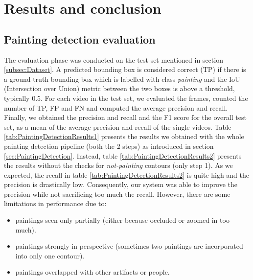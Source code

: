 \documentclass[10pt,twocolumn,letterpaper]{article}
\begin{document}
\section{Results and conclusion}
\label{sec:ResultsAndConclusion}
\subsection{Painting detection evaluation}
\label{subsec:PaintingDetectionEvaluation}

The evaluation phase was conducted on the test set mentioned in section \ref{subsec:Dataset}.
A predicted bounding box is considered correct (TP) if there is a ground-truth bounding box which is labelled with class \textit{painting} and the IoU (Intersection over Union) metric between the two boxes is above a threshold, typically 0.5.
For each video in the test set, we evaluated the frames, counted the number of TP, FP and FN and computed the average precision and recall. Finally, we obtained the precision and recall and the F1 score for the overall test set, as a mean of the average precision and recall of the single videos.
Table \ref{tab:PaintingDetectionResults1} presents the results we obtained with the whole painting detection pipeline (both the 2 steps) as introduced in section \ref{sec:PaintingDetection}. Instead, table \ref{tab:PaintingDetectionResults2} presents the results without the checks for \textit{not-painting} contours (only step 1). As we expected, the recall in table \ref{tab:PaintingDetectionResults2} is quite high and the precision is drastically low. Consequently, our system was able to improve the precision while not sacrificing too much the recall. 
However, there are some limitations in performance due to:
\begin{itemize}
    \item paintings seen only partially (either because occluded or zoomed in too much).
    \item paintings strongly in perspective (sometimes two paintings are incorporated into only one contour).
    \item paintings overlapped with other artifacts or people.
\end{itemize}
\end{document}
